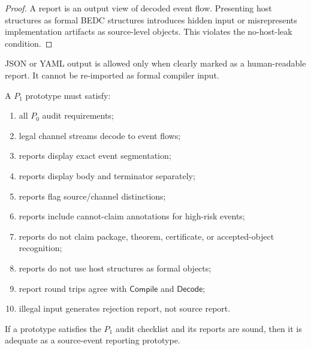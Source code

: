 \begin{proof}
A report is an output view of decoded event flow. Presenting host structures as formal BEDC structures introduces hidden input or misrepresents implementation artifacts as source-level objects. This violates the no-host-leak condition.
\end{proof}

\begin{corollary}
\label{cor:source-report-json-yaml-view-only}
JSON or YAML output is allowed only when clearly marked as a human-readable report. It cannot be re-imported as formal compiler input.
\end{corollary}

\begin{definition}
\label{def:source-report-p1-audit}
A $P_1$ prototype must satisfy:
\begin{enumerate}
\item all $P_0$ audit requirements;
\item legal channel streams decode to event flows;
\item reports display exact event segmentation;
\item reports display body and terminator separately;
\item reports flag source/channel distinctions;
\item reports include cannot-claim annotations for high-risk events;
\item reports do not claim package, theorem, certificate, or accepted-object recognition;
\item reports do not use host structures as formal objects;
\item report round trips agree with $\mathsf{Compile}$ and $\mathsf{Decode}$;
\item illegal input generates rejection report, not source report.
\end{enumerate}
\end{definition}

\begin{theorem}
\label{thm:source-report-p1-adequacy}
If a prototype satisfies the $P_1$ audit checklist and its reports are sound, then it is adequate as a source-event reporting prototype.
\end{theorem}

